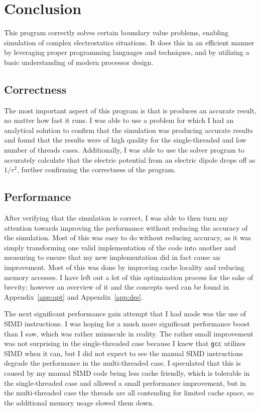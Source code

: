 \section{Conclusion}

This program correctly solves certain boundary value problems, enabling simulation
of complex electrostatics situations. It does this in an efficient manner by leveraging
proper programming languages and techniques, and by utilizing a basic understanding of modern processor
design.

\subsection{Correctness}

The most important aspect of this program is that is produces an accurate result, no
matter how fast it runs. I was able to use a problem for which I had an analytical
solution to confirm that the simulation was producing accurate results and found that
the results were of high quality for the single-threaded and low number of threads
cases. Additionally, I was able to use the solver program to accurately calculate
that the electric potential from an electric dipole drops off as $1/r^2$, further
confirming the correctness of the program.


\subsection{Performance}

After verifying that the simulation is correct, I was able to then turn my attention towards improving
the performance without reducing the accuracy of the simulation. Most of this was easy to
do without reducing accuracy, as it was simply transforming one valid implementation of
the code into another and measuring to ensure that my new implementation did in fact
cause an improvement. Most of this was done by improving cache locality and reducing
memory accesses. I have left out a lot of this optimization process for the sake of brevity; however an overview
of it and the concepts used can be found in Appendix~\ref{app:opt} and Appendix~\ref{app:des}.

The next significant performance gain attempt that I had made was the use of SIMD instructions.
I was hoping for a much more significant performance boost than I saw, which was rather
minuscule in reality. The rather small improvement was not surprising in the single-threaded
case because I knew that \texttt{gcc} utilizes SIMD when it can, but I did not expect to see
the manual SIMD instructions degrade the performance in the multi-threaded case. I speculated
that this is caused by my manual SIMD code being less cache friendly, which is tolerable in the
single-threaded case and allowed a small performance improvement, but in the multi-threaded case
the threads are all contending for limited cache space, so the additional memory usage slowed
them down.

